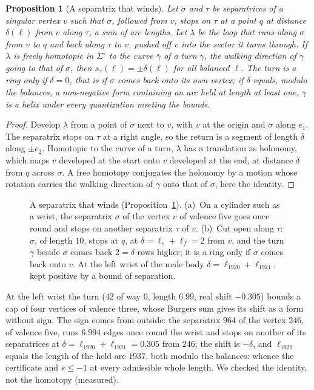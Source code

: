 \documentclass[11pt,a4paper]{article}
\newtheorem{proposition}{Proposition}
\newcommand{\shift}{s}
\begin{document}
\begin{proposition}[A separatrix that winds]\label{prop:winding}
Let $\sigma$ and $\tau$ be separatrices of a singular vertex $v$ such that
$\sigma$, followed from $v$, stops on $\tau$ at a point $q$ at distance
$\delta(\ell)$ from $v$ along $\tau$, a sum of arc lengths. Let $\lambda$ be
the loop that runs along $\sigma$ from $v$ to $q$ and back along $\tau$ to $v$,
pushed off $v$ into the sector it turns through. If $\lambda$ is freely
homotopic in $\Sigma^\circ$ to the curve $\bar\gamma$ of a turn $\gamma$, the
walking direction of $\gamma$ going to that of $\sigma$, then
$\shift_\gamma(\ell) = \pm\delta(\ell)$ for all balanced $\ell$. The turn is a
ring only if $\delta = 0$, that is if $\sigma$ comes back onto its own vertex;
if $\delta$ equals, modulo the balances, a non-negative form containing an arc
held at length at least one, $\gamma$ is a helix under every quantization
meeting the bounds.
\end{proposition}

\begin{proof}
Develop $\lambda$ from a point of $\sigma$ next to $v$, with $v$ at the origin
and $\sigma$ along $e_1$. The separatrix stops on $\tau$ at a right angle, so
the return is a segment of length $\delta$ along $\pm e_2$. Homotopic to the
curve of a turn, $\lambda$ has a translation as holonomy, which maps $v$
developed at the start onto $v$ developed at the end, at distance $\delta$
from $q$ across $\sigma$. A free homotopy conjugates the holonomy by a motion
whose rotation carries the walking direction of $\gamma$ onto that of
$\sigma$, here the identity.
\end{proof}

\begin{figure}[t]
\centering

\caption{A separatrix that winds (Proposition~\ref{prop:winding}). (a)~On
a cylinder such as a wrist, the separatrix $\sigma$ of the vertex $v$ of
valence five goes once round and stops on another separatrix $\tau$ of $v$.
(b)~Cut open along $\tau$: $\sigma$, of length $10$, stops at $q$, at
$\delta = \ell_e + \ell_f = 2$ from $v$, and the turn $\gamma$ beside
$\sigma$ comes back $2 = \delta$ rows higher; it is a ring only if $\sigma$
comes back onto $v$. At the left wrist of the male body $\delta = \ell_{1920}
+ \ell_{1921}$, kept positive by a bound of separation.}
\label{fig:separatrix}
\end{figure}

At the left wrist the turn ($42$ of way 0, length $6.99$, real shift
$-0.305$) bounds a cap of four vertices of valence three, whose Burgers sum
gives its shift as a form without sign. The sign comes from outside: the
separatrix $964$ of the vertex $246$, of valence five, runs $6.994$ edges once
round the wrist and stops on another of its separatrices at $\delta =
\ell_{1920} + \ell_{1921} = 0.305$ from $246$; the shift is $-\delta$, and
$\ell_{1920}$ equals the length of the held arc $1937$, both modulo the
balances: whence the certificate and $\shift \le -1$ at every admissible whole
length. We checked the identity, not the homotopy (measured).
\end{document}
